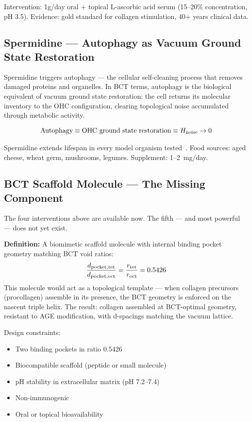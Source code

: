 \documentclass[twocolumn,10pt]{article}
\begin{document}
Intervention: 1g/day oral $+$ topical L-ascorbic acid serum
(15--20\% concentration, pH 3.5). Evidence: gold standard for
collagen stimulation, 40+ years clinical data.

\subsection{Spermidine — Autophagy as Vacuum Ground State Restoration}

Spermidine triggers autophagy — the cellular self-cleaning
process that removes damaged proteins and organelles. In BCT
terms, autophagy is the biological equivalent of vacuum ground
state restoration: the cell returns its molecular inventory to
the OHC configuration, clearing topological noise accumulated
through metabolic activity.

\begin{equation}
\text{Autophagy} \equiv \text{OHC ground state restoration} \equiv H_{\rm noise} \to 0
\end{equation}

Spermidine extends lifespan in every model organism tested~\cite{spermidine}.
Food sources: aged cheese, wheat germ, mushrooms, legumes.
Supplement: 1--2~mg/day.

\subsection{BCT Scaffold Molecule — The Missing Component}

The four interventions above are available now. The fifth —
and most powerful — does not yet exist.

\textbf{Definition:} A biomimetic scaffold molecule with internal
binding pocket geometry matching BCT void ratios:
\begin{equation}
\frac{d_{\rm pocket,tet}}{d_{\rm pocket,oct}} = \frac{r_{\rm tet}}{r_{\rm oct}} = 0.5426
\end{equation}
This molecule would act as a topological template — when collagen
precursors (procollagen) assemble in its presence, the BCT geometry
is enforced on the nascent triple helix. The result: collagen
assembled at BCT-optimal geometry, resistant to AGE modification,
with d-spacings matching the vacuum lattice.

Design constraints:
\begin{itemize}
\item Two binding pockets in ratio 0.5426
\item Biocompatible scaffold (peptide or small molecule)
\item pH stability in extracellular matrix (pH 7.2--7.4)
\item Non-immunogenic
\item Oral or topical bioavailability
\end{itemize}
\end{document}

